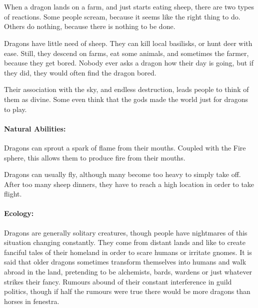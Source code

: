 \section{}
\label{dragon}

\begin{multicols}{2}


\noindent
When a dragon lands on a farm, and just starts eating sheep, there are two types of reactions.
Some people scream, because it seems like the right thing to do.
Others do nothing, because there is nothing to be done.

Dragons have little need of sheep.
They can kill local \glspl{basilisk}, or hunt deer with ease.
Still, they descend on farms, eat some animals, and sometimes the farmer, because they get bored.
Nobody ever asks a dragon how their day is going, but if they did, they would often find the dragon bored.

Their association with the sky, and endless destruction, leads people to think of them as divine.
Some even think that the gods made the world just for dragons to play.

\paragraph{Natural Abilities:}
Dragons can sprout a spark of flame from their mouths.
Coupled with the Fire sphere, this allows them to produce fire from their mouths.

Dragons can usually fly, although many become too heavy to simply take off.
After too many sheep dinners, they have to reach a high location in order to take flight.

\paragraph{Ecology:} Dragons are generally solitary creatures, though people have nightmares of this situation changing constantly.
They come from distant lands and like to create fanciful tales of their homeland in order to scare humans or irritate gnomes.
It is said that older dragons sometimes transform themselves into humans and walk abroad in the land, pretending to be alchemists, bards, \glspl{warden} or just whatever strikes their fancy.
Rumours abound of their constant interference in guild politics, though if half the rumours were true there would be more dragons than horses in \gls{fenestra}.


\end{multicols}
